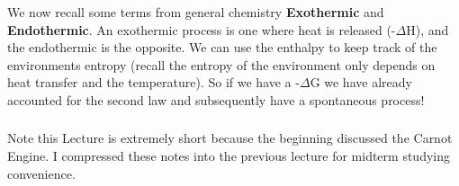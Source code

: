 \documentclass{article}
\begin{document}
We now recall some terms from general chemistry \textbf{Exothermic} and \textbf{Endothermic}.
An exothermic process is one where heat is released (-$\Delta$H), and the endothermic is the opposite. 
We can use the enthalpy to keep track of the environments entropy (recall the entropy of the environment only depends on heat transfer and the temperature). 
So if we have a -$\Delta$G we have already accounted for the second law and subsequently have a spontaneous process!

\subsubsection*{}
Note this Lecture is extremely short because the beginning discussed the Carnot Engine. 
I compressed these notes into the previous lecture for midterm studying convenience. 
\end{document}
